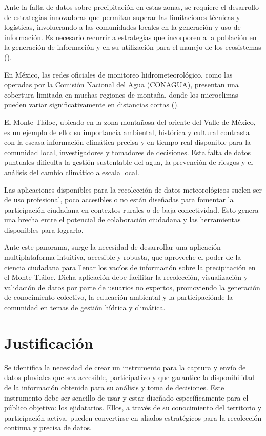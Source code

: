 Ante la falta de datos sobre precipitación en estas zonas, se requiere el desarrollo de estrategias innovadoras que permitan superar las limitaciones técnicas y logísticas, involucrando a las comunidades locales en la generación y uso de información. Es necesario recurrir a estrategias que incorporen a la población en la generación de información y en su utilización para el manejo de los ecosistemas (\cite{hubp1990}).


En México, las redes oficiales de monitoreo hidrometeorológico, como las operadas por la Comisión Nacional del Agua (CONAGUA), presentan una cobertura limitada en muchas regiones de montaña, donde los microclimas pueden variar significativamente en distancias cortas (\cite{rosas2021}).


El Monte Tláloc, ubicado en la zona montañosa del oriente del Valle de México, es un ejemplo de ello: su importancia ambiental, histórica y cultural contrasta con la escasa información climática precisa y en tiempo real disponible para la comunidad local, investigadores y tomadores de decisiones. Esta falta de datos puntuales dificulta la gestión sustentable del agua, la prevención de riesgos y el análisis del cambio climático a escala local.

Las aplicaciones disponibles para la recolección de datos meteorológicos suelen ser de uso profesional, poco accesibles o no están diseñadas para fomentar la participación ciudadana en contextos rurales o de baja conectividad. Esto genera una brecha entre el potencial de colaboración ciudadana y las herramientas disponibles para lograrlo.

Ante este panorama, surge la necesidad de desarrollar una aplicación multiplataforma intuitiva, accesible y robusta, que aproveche el poder de la ciencia ciudadana para llenar los vacíos de información sobre la precipitación en el Monte Tláloc. Dicha aplicación debe facilitar la recolección, visualización y validación de datos por parte de usuarios no expertos, promoviendo la generación de conocimiento colectivo, la educación ambiental y la participaciónde la comunidad en temas de gestión hídrica y climática.



\section{Justificación}
Se identifica la necesidad de crear un instrumento para la captura y envío de datos pluviales que sea accesible, participativo y que garantice la disponibilidad de la información obtenida para su análisis y toma de decisiones. Este instrumento debe ser sencillo de usar y estar diseñado específicamente para el público objetivo: los ejidatarios. Ellos, a través de su conocimiento del territorio y participación activa, pueden convertirse en aliados estratégicos para la recolección continua y precisa de datos.

